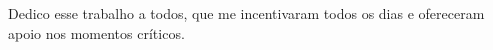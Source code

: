Dedico esse trabalho a todos, que me incentivaram todos os dias e ofereceram apoio nos momentos críticos.